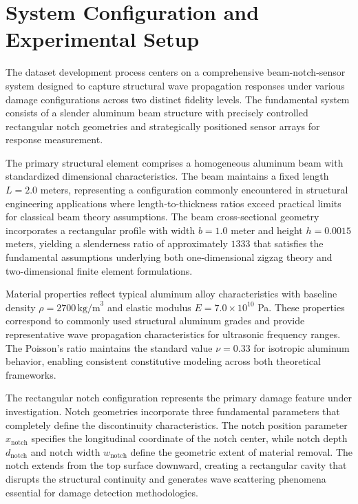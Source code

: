 \documentclass[12pt,a4paper]{report}
\begin{document}
\section{System Configuration and Experimental Setup}

The dataset development process centers on a comprehensive beam-notch-sensor system designed to capture structural wave propagation responses under various damage configurations across two distinct fidelity levels. The fundamental system consists of a slender aluminum beam structure with precisely controlled rectangular notch geometries and strategically positioned sensor arrays for response measurement.

The primary structural element comprises a homogeneous aluminum beam with standardized dimensional characteristics. The beam maintains a fixed length $L = 2.0$ meters, representing a configuration commonly encountered in structural engineering applications where length-to-thickness ratios exceed practical limits for classical beam theory assumptions. The beam cross-sectional geometry incorporates a rectangular profile with width $b = 1.0$ meter and height $h = 0.0015$ meters, yielding a slenderness ratio of approximately $1333$ that satisfies the fundamental assumptions underlying both one-dimensional zigzag theory and two-dimensional finite element formulations.

Material properties reflect typical aluminum alloy characteristics with baseline density $\rho = 2700 \,\text{kg/m}^3$ and elastic modulus $E = 7.0 \times 10^{10}$ Pa. These properties correspond to commonly used structural aluminum grades and provide representative wave propagation characteristics for ultrasonic frequency ranges. The Poisson's ratio maintains the standard value $\nu = 0.33$ for isotropic aluminum behavior, enabling consistent constitutive modeling across both theoretical frameworks.

The rectangular notch configuration represents the primary damage feature under investigation. Notch geometries incorporate three fundamental parameters that completely define the discontinuity characteristics. The notch position parameter $x_{\text{notch}}$ specifies the longitudinal coordinate of the notch center, while notch depth $d_{\text{notch}}$ and notch width $w_{\text{notch}}$ define the geometric extent of material removal. The notch extends from the top surface downward, creating a rectangular cavity that disrupts the structural continuity and generates wave scattering phenomena essential for damage detection methodologies.
\end{document}
